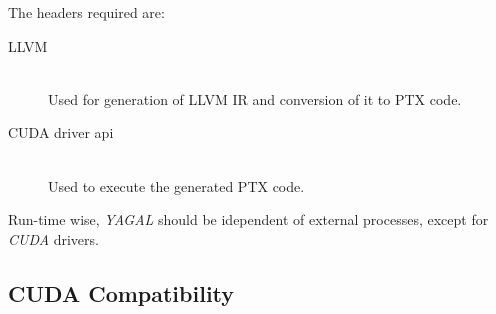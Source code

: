 The headers required are:
\begin{description}
\item[LLVM] \hfill\\
Used for generation of LLVM IR and conversion of it to PTX code.
\item[CUDA driver api] \hfill\\
Used to execute the generated PTX code.
\end{description}

Run-time wise, \textit{YAGAL} should be idependent of external processes, except for \textit{CUDA} drivers. 


\subsection{CUDA Compatibility}
